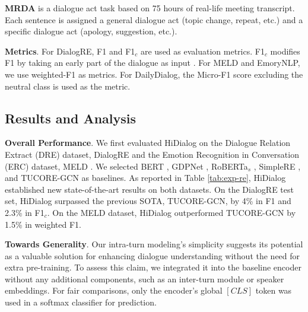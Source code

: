 \textbf{MRDA} \citep{MRDA} is a dialogue act task based on 75 hours of real-life meeting transcript. Each sentence is assigned a general dialogue act (topic change, repeat, etc.) and a specific dialogue act (apology, suggestion, etc.).  %

\textbf{Metrics}. For DialogRE, F1 and F1$_c$ are used as evaluation metrics. F1$_c$ modifies F1 by taking an early part of the dialogue as input \cite{yu-etal-2020-dialogue}. For MELD and EmoryNLP, we use weighted-F1 as metrics. For DailyDialog, the Micro-F1 score excluding the neutral class is used as the metric. 
\subsection{Results and Analysis}
\textbf{Overall Performance}. We first evaluated HiDialog on the Dialogue Relation Extract (DRE) dataset, DialogRE \citep{yu-etal-2020-dialogue} and the Emotion Recognition in Conversation (ERC) dataset, MELD \citep{poria-etal-2019-meld}. We selected BERT \citep{bertbase}, GDPNet \citep{xue2021gdpnet}, RoBERTa$_s$ \citep{yu-etal-2020-dialogue}, SimpleRE \citep{SimpleRE}, and TUCORE-GCN \citep{lee2021graph} as baselines. As reported in Table \ref{tab:exp-re}, HiDialog established new state-of-the-art results on both datasets. 
On the DialogRE test set, HiDialog surpassed the previous SOTA, TUCORE-GCN, by 4\% in F1 and 2.3\% in F1$_c$. On the MELD dataset, HiDialog outperformed TUCORE-GCN by 1.5\% in weighted F1. 


\textbf{Towards Generality}.
Our intra-turn modeling's simplicity suggests its potential as a valuable solution for enhancing dialogue understanding without the need for extra pre-training. To assess this claim, we integrated it into the baseline encoder without any additional components, such as an inter-turn module or speaker embeddings. For fair comparisons, only the encoder's global $[CLS]$ token was used in a softmax classifier for prediction.

